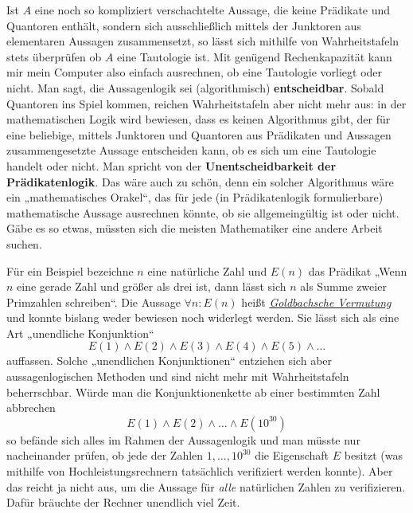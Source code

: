 \begin{vorschau} \label{entscheidbar}
    Ist $A$ eine noch so kompliziert verschachtelte Aussage, die keine Prädikate und Quantoren enthält, sondern sich ausschließlich mittels der Junktoren aus elementaren Aussagen zusammensetzt, so lässt sich mithilfe von Wahrheitstafeln stets überprüfen ob $A$ eine Tautologie ist. Mit genügend Rechenkapazität kann mir mein Computer also einfach ausrechnen, ob eine Tautologie vorliegt oder nicht. Man sagt, die Aussagenlogik sei (algorithmisch) \textbf{entscheidbar}. Sobald Quantoren ins Spiel kommen, reichen Wahrheitstafeln aber nicht mehr aus: in der mathematischen Logik wird bewiesen, dass es keinen Algorithmus gibt, der für eine beliebige, mittels Junktoren und Quantoren aus Prädikaten und Aussagen zusammengesetzte Aussage entscheiden kann, ob es sich um eine Tautologie handelt oder nicht. Man spricht von der \textbf{Unentscheidbarkeit der Prädikatenlogik}. Das wäre auch zu schön, denn ein solcher Algorithmus wäre ein „mathematisches Orakel“, das für jede (in Prädikatenlogik formulierbare) mathematische Aussage ausrechnen könnte, ob sie allgemeingültig ist oder nicht. Gäbe es so etwas, müssten sich die meisten Mathematiker eine andere Arbeit suchen.
    
    Für ein Beispiel bezeichne $n$ eine natürliche Zahl und $E(n)$ das Prädikat „Wenn $n$ eine gerade Zahl und größer als drei ist, dann lässt sich $n$ als Summe zweier Primzahlen schreiben“. Die Aussage $\forall n:E(n)$ heißt \href{https://de.wikipedia.org/wiki/Goldbachsche_Vermutung}{\emph{Goldbachsche Vermutung}} und konnte bislang weder bewiesen noch widerlegt werden. Sie lässt sich als eine Art „unendliche Konjunktion“
        \[E(1)\land  E(2)\land E(3)\land E(4)\land E(5) \land \dots \]
    auffassen. Solche „unendlichen Konjunktionen“ entziehen sich aber aussagenlogischen Methoden und sind nicht mehr mit Wahrheitstafeln beherrschbar. Würde man die Konjunktionenkette ab einer bestimmten Zahl abbrechen
        \[ E(1)\land E(2)\land\dots \land E(10^{30}) \]
    so befände sich alles im Rahmen der Aussagenlogik und man müsste nur nacheinander prüfen, ob jede der Zahlen $1,\dots , 10^{30}$ die Eigenschaft $E$ besitzt (was mithilfe von Hochleistungsrechnern tatsächlich verifiziert werden konnte). Aber das reicht ja nicht aus, um die Aussage für \emph{alle} natürlichen Zahlen zu verifizieren. Dafür bräuchte der Rechner unendlich viel Zeit.
\end{vorschau}





